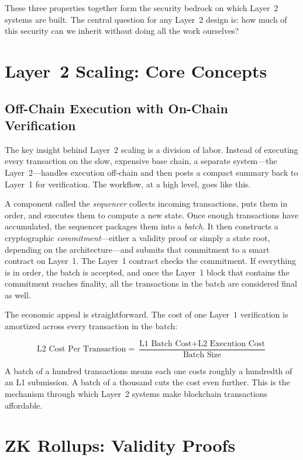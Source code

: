 \documentclass[
]{elteikthesis}[2024/04/26]
\begin{document}
These three properties together form the security bedrock on which Layer~2 systems are built. The central question for any Layer~2 design is: how much of this security can we inherit without doing all the work ourselves?

\section{Layer~2 Scaling: Core Concepts}

\subsection{Off-Chain Execution with On-Chain Verification}

The key insight behind Layer~2 scaling is a division of labor. Instead of executing every transaction on the slow, expensive base chain, a separate system---the Layer~2---handles execution off-chain and then posts a compact summary back to Layer~1 for verification. The workflow, at a high level, goes like this.

A component called the \textit{sequencer} collects incoming transactions, puts them in order, and executes them to compute a new state. Once enough transactions have accumulated, the sequencer packages them into a \textit{batch}. It then constructs a cryptographic \textit{commitment}---either a validity proof or simply a state root, depending on the architecture---and submits that commitment to a smart contract on Layer~1. The Layer~1 contract checks the commitment. If everything is in order, the batch is accepted, and once the Layer~1 block that contains the commitment reaches finality, all the transactions in the batch are considered final as well.

The economic appeal is straightforward. The cost of one Layer~1 verification is amortized across every transaction in the batch:

\begin{equation}
\text{L2 Cost Per Transaction} = \frac{\text{L1 Batch Cost} + \text{L2 Execution Cost}}{\text{Batch Size}}
\end{equation}

\noindent A batch of a hundred transactions means each one costs roughly a hundredth of an L1 submission. A batch of a thousand cuts the cost even further. This is the mechanism through which Layer~2 systems make blockchain transactions affordable.

\section{ZK Rollups: Validity Proofs}
\end{document}
